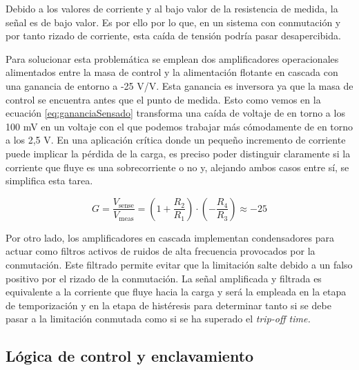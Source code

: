 \documentclass[12pt]{report} %
\begin{document}
Debido a los valores de corriente y al bajo valor de la resistencia de medida, la señal es de bajo valor. Es por ello por lo que, en un sistema con conmutación y por tanto rizado de corriente, esta caída de tensión podría pasar desapercibida. 

Para solucionar esta problemática se emplean dos amplificadores operacionales alimentados entre la masa de control y la alimentación flotante en cascada con una ganancia de entorno a -25 V/V. Esta ganancia es inversora ya que la masa de control se encuentra antes que el punto de medida.
Esto como vemos en la ecuación \ref{eq:gananciaSensado} transforma una caída de voltaje de en torno a los 100 mV en un voltaje con el que podemos trabajar más cómodamente de en torno a los 2,5 V. En una aplicación crítica donde un pequeño incremento de corriente puede implicar la pérdida de la carga, es preciso poder distinguir claramente si la corriente que fluye es una sobrecorriente o no y, alejando ambos casos entre sí, se simplifica esta tarea. 

\begin{equation}
    G = \frac{V_{\text{sense}}}{V_{\text{meas}}} = \left( 1 + \frac{R_2}{R_1} \right) \cdot \left( - \frac{R_4}{R_3}\right) \approx -25
\label{eq:gananciaSensado}
\end{equation}

Por otro lado, los amplificadores en cascada implementan condensadores para actuar como filtros activos de ruidos de alta frecuencia provocados por la conmutación. Este filtrado permite evitar que la limitación salte debido a un falso positivo por el rizado de la conmutación. 
La señal amplificada y filtrada es equivalente a la corriente que fluye hacia la carga y será la empleada en la etapa de temporización y en la etapa de histéresis para determinar tanto si se debe pasar a la limitación conmutada como si se ha superado el \textit{trip-off time.}

\subsection{Lógica de control y enclavamiento}
\end{document}
